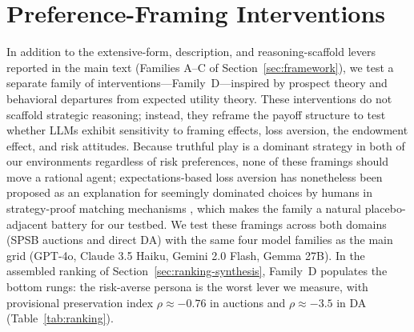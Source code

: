 \section{Preference-Framing Interventions}\label{app:prospect}

In addition to the extensive-form, description, and reasoning-scaffold levers reported in the main text (Families A--C of Section~\ref{sec:framework}), we test a separate family of interventions---Family~D---inspired by prospect theory \citep{kahneman1979prospect} and behavioral departures from expected utility theory. These interventions do not scaffold strategic reasoning; instead, they reframe the payoff structure to test whether LLMs exhibit sensitivity to framing effects, loss aversion, the endowment effect, and risk attitudes. Because truthful play is a dominant strategy in both of our environments regardless of risk preferences, none of these framings should move a rational agent; expectations-based loss aversion has nonetheless been proposed as an explanation for seemingly dominated choices by humans in strategy-proof matching mechanisms \citep{dreyfuss2022expectations}, which makes the family a natural placebo-adjacent battery for our testbed. We test these framings across both domains (SPSB auctions and direct DA) with the same four model families as the main grid (GPT-4o, Claude 3.5 Haiku, Gemini 2.0 Flash, Gemma 27B). In the assembled ranking of Section~\ref{sec:ranking-synthesis}, Family~D populates the bottom rungs: the risk-averse persona is the worst lever we measure, with provisional preservation index $\rho \approx -0.76$ in auctions and $\rho \approx -3.5$ in DA (Table~\ref{tab:ranking}).



